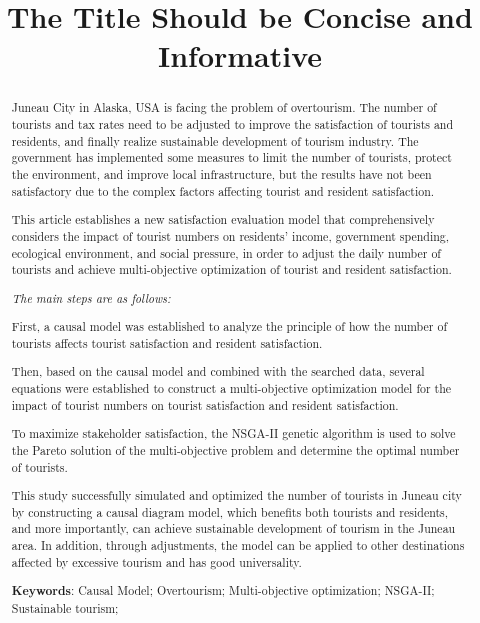 \documentclass[12pt]{article}  %
\title{The Title Should be Concise and Informative}  %
\begin{document}
 
 \begin{abstract}
Juneau City in Alaska, USA is facing the problem of overtourism. The number of tourists and tax rates need to be adjusted to improve the satisfaction of tourists and residents, and finally realize sustainable development of tourism industry. The government has implemented some measures to limit the number of tourists, protect the environment, and improve local infrastructure, but the results have not been satisfactory due to the complex factors affecting tourist and resident satisfaction.
     
This article establishes a new satisfaction evaluation model that comprehensively considers the impact of tourist numbers on residents' income, government spending, ecological environment, and social pressure, in order to adjust the daily number of tourists and achieve multi-objective optimization of tourist and resident satisfaction.

\textit{The main steps are as follows:}
 
First, a causal model was established to analyze the principle of how the number of tourists affects tourist satisfaction and resident satisfaction.

 Then, based on the causal model and combined with the searched data, several equations were established to construct a multi-objective optimization model for the impact of tourist numbers on tourist satisfaction and resident satisfaction.

 To maximize stakeholder satisfaction, the NSGA-II genetic algorithm is used to solve the Pareto solution of the multi-objective problem and determine the optimal number of tourists.
 
 This study successfully simulated and optimized the number of tourists in Juneau city by constructing a causal diagram model, which benefits both tourists and residents, and more importantly, can achieve sustainable development of tourism in the Juneau area. In addition, through adjustments, the model can be applied to other destinations affected by excessive tourism and has good universality.
     
     \vspace{5pt}  %
     \textbf{Keywords}: Causal Model; Overtourism; Multi-objective optimization; NSGA-II; Sustainable tourism;
 
 \end{abstract}
 
\end{document}

